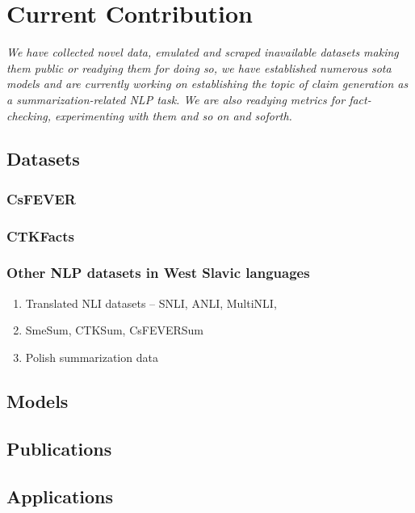 
\chapter{Current Contribution}
\label{chap:contribution}

\textit{We have collected novel data, emulated and scraped inavailable datasets making them public or readying them for doing so, we have established numerous sota models and are currently working on establishing the topic of claim generation as a summarization-related NLP task.
We are also readying metrics for fact-checking, experimenting with them and so on and soforth.}

\section{Datasets}
\label{sec:pretrain}
\subsection{CsFEVER}
\subsection{CTKFacts}
\subsection{Other NLP datasets in West Slavic languages}
\begin{enumerate}
    \item {\techbf Translated NLI datasets} -- SNLI, ANLI, MultiNLI, 
    \item SmeSum, CTKSum, CsFEVERSum
    \item Polish summarization data
\end{enumerate}
\section{Models}
\label{sec:models}
\section{Publications}
\label{sec:models}
\section{Applications}
\label{sec:models}

